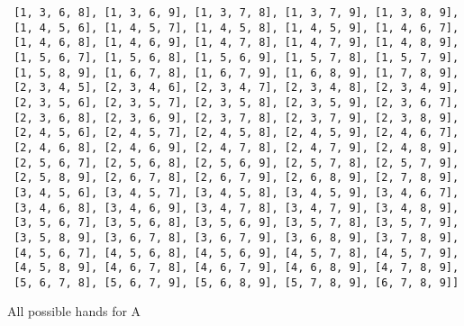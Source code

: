 \documentclass{article}
\begin{document}
\begin{table}
\begin{verbatim}
 [1, 3, 6, 8], [1, 3, 6, 9], [1, 3, 7, 8], [1, 3, 7, 9], [1, 3, 8, 9], 
 [1, 4, 5, 6], [1, 4, 5, 7], [1, 4, 5, 8], [1, 4, 5, 9], [1, 4, 6, 7], 
 [1, 4, 6, 8], [1, 4, 6, 9], [1, 4, 7, 8], [1, 4, 7, 9], [1, 4, 8, 9], 
 [1, 5, 6, 7], [1, 5, 6, 8], [1, 5, 6, 9], [1, 5, 7, 8], [1, 5, 7, 9], 
 [1, 5, 8, 9], [1, 6, 7, 8], [1, 6, 7, 9], [1, 6, 8, 9], [1, 7, 8, 9], 
 [2, 3, 4, 5], [2, 3, 4, 6], [2, 3, 4, 7], [2, 3, 4, 8], [2, 3, 4, 9], 
 [2, 3, 5, 6], [2, 3, 5, 7], [2, 3, 5, 8], [2, 3, 5, 9], [2, 3, 6, 7], 
 [2, 3, 6, 8], [2, 3, 6, 9], [2, 3, 7, 8], [2, 3, 7, 9], [2, 3, 8, 9], 
 [2, 4, 5, 6], [2, 4, 5, 7], [2, 4, 5, 8], [2, 4, 5, 9], [2, 4, 6, 7], 
 [2, 4, 6, 8], [2, 4, 6, 9], [2, 4, 7, 8], [2, 4, 7, 9], [2, 4, 8, 9], 
 [2, 5, 6, 7], [2, 5, 6, 8], [2, 5, 6, 9], [2, 5, 7, 8], [2, 5, 7, 9], 
 [2, 5, 8, 9], [2, 6, 7, 8], [2, 6, 7, 9], [2, 6, 8, 9], [2, 7, 8, 9], 
 [3, 4, 5, 6], [3, 4, 5, 7], [3, 4, 5, 8], [3, 4, 5, 9], [3, 4, 6, 7], 
 [3, 4, 6, 8], [3, 4, 6, 9], [3, 4, 7, 8], [3, 4, 7, 9], [3, 4, 8, 9], 
 [3, 5, 6, 7], [3, 5, 6, 8], [3, 5, 6, 9], [3, 5, 7, 8], [3, 5, 7, 9], 
 [3, 5, 8, 9], [3, 6, 7, 8], [3, 6, 7, 9], [3, 6, 8, 9], [3, 7, 8, 9], 
 [4, 5, 6, 7], [4, 5, 6, 8], [4, 5, 6, 9], [4, 5, 7, 8], [4, 5, 7, 9], 
 [4, 5, 8, 9], [4, 6, 7, 8], [4, 6, 7, 9], [4, 6, 8, 9], [4, 7, 8, 9], 
 [5, 6, 7, 8], [5, 6, 7, 9], [5, 6, 8, 9], [5, 7, 8, 9], [6, 7, 8, 9]]
\end{verbatim}
\caption{All possible hands for A}
\label{listHands}
\end{table}
\end{document}
